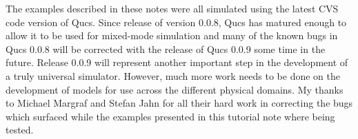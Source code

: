 
The examples described in these notes were all simulated using the
latest CVS code version of Qucs. Since release of version 0.0.8, Qucs
has matured enough to allow it to be used for mixed-mode simulation
and many of the known bugs in Qucs 0.0.8 will be corrected with the
release of Qucs 0.0.9 some time in the future.  Release 0.0.9 will
represent another important step in the development of a truly
universal simulator.  However, much more work needs to be done on the
development of models for use across the different physical
domains. My thanks to Michael Margraf and Stefan Jahn for all their
hard work in correcting the bugs which surfaced while the examples
presented in this tutorial note where being tested.



